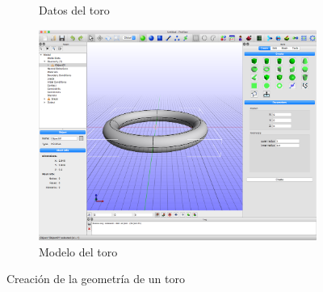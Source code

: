 \begin{figure}[!ht]
\begin{subfigure}[b]{0.28\textwidth}
\caption{Datos del toro}
\label{fig:01_build-create}
\end{subfigure}
\hfil
\begin{subfigure}[b]{0.48\textwidth}
\includegraphics[width=\linewidth]{figuras_4/01_build-torus.png}
\caption{Modelo del toro}
\label{fig:01_build-torus}
\end{subfigure}
\caption{Creación de la geometría de un toro}
\label{fig:01_build-create-torus}
\end{figure}

